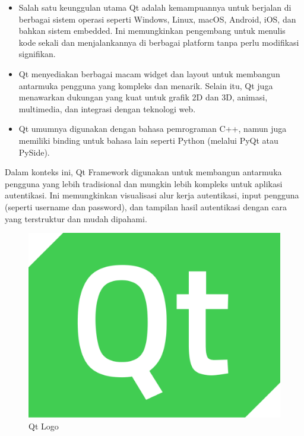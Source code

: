 \begin{itemize}
	\item {} Salah satu keunggulan utama Qt adalah kemampuannya untuk berjalan di berbagai sistem operasi seperti Windows, Linux, macOS, Android, iOS, dan bahkan sistem embedded. Ini memungkinkan pengembang untuk menulis kode sekali dan menjalankannya di berbagai platform tanpa perlu modifikasi signifikan.
	\item {} Qt menyediakan berbagai macam widget dan layout untuk membangun antarmuka pengguna yang kompleks dan menarik. Selain itu, Qt juga menawarkan dukungan yang kuat untuk grafik 2D dan 3D, animasi, multimedia, dan integrasi dengan teknologi web.
	\item {} Qt umumnya digunakan dengan bahasa pemrograman C++, namun juga memiliki binding untuk bahasa lain seperti Python (melalui PyQt atau PySide).
\end{itemize}

Dalam konteks ini, Qt Framework digunakan untuk membangun antarmuka pengguna yang lebih tradisional dan mungkin lebih kompleks untuk aplikasi autentikasi. Ini memungkinkan visualisasi alur kerja autentikasi, input pengguna (seperti username dan password), dan tampilan hasil autentikasi dengan cara yang terstruktur dan mudah dipahami.

\begin{figure}
	\centering
	\includegraphics[width=0.15\textheight]
	{assets/pics/Qt_logo.png}
	\caption{Qt Logo \cite{Qt}}
\end{figure}

